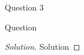 \begin{solution}{Question 3}\label{ques:3}
    \begin{question}
    Question
    \end{question}
    \tcblower{}
    \begin{proof}[Solution]
        Solution
    \end{proof}
\end{solution}
